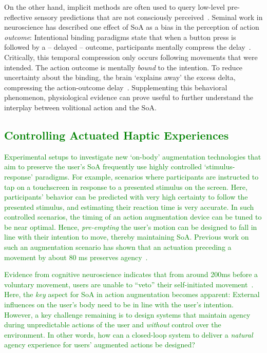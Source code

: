 On the other hand, implicit methods are often used to query low-level pre-reflective sensory predictions that are not consciously perceived~\cite{Moore2016-ub, Limerick2014-un, Moore2012-ic}. Seminal work in neuroscience has described one effect of SoA as a bias in the perception of action \textit{outcome}: Intentional binding paradigms state that when a button press is followed by a -- delayed -- outcome, participants mentally compress the delay~\cite{Haggard2002-sz}. Critically, this temporal compression only occurs following movements that were intended. The action outcome is mentally \textit{bound} to the intention. To reduce uncertainty about the binding, the brain `explains away' the excess delta, compressing the action-outcome delay~\cite{Barlas2018-bq}. Supplementing this behavioral phenomenon, physiological evidence can prove useful to further understand the interplay between volitional action and the SoA.

\subsection{\textcolor{green}{Controlling Actuated Haptic Experiences}}

\textcolor{green}{Experimental setups to investigate new `on-body' augmentation technologies that aim to preserve the user's SoA frequently use highly controlled `stimulus-response' paradigms. For example, scenarios where participants are instructed to tap on a touchscreen in response to a presented stimulus on the screen. Here, participants' behavior can be predicted with very high certainty to follow the presented stimulus, and estimating their reaction time is very accurate. In such controlled scenarios, the timing of an action augmentation device can be tuned to be near optimal. Hence, \textit{pre-empting} the user's motion can be designed to fall in line with their intention to move, thereby maintaining SoA. Previous work on such an augmentation scenario has shown that an actuation preceding a movement by about 80 ms preserves agency~\cite{Kasahara2019-sk, Kasahara2021-gy}.}

\textcolor{green}{Evidence from cognitive neuroscience indicates that from around 200ms before a voluntary movement, users are unable to ``veto'' their self-initiated movement~\cite{Schultze-Kraft2016-bx}. Here, the \textit{key} aspect for SoA in action augmentation becomes apparent: External influences on the user's body need to be in line with the user's intention. However, a key challenge remaining is to design systems that maintain agency during unpredictable actions of the user and \textit{without} control over the environment. In other words, how can a closed-loop system to deliver a \textit{natural} agency experience for users' augmented actions be designed?}


